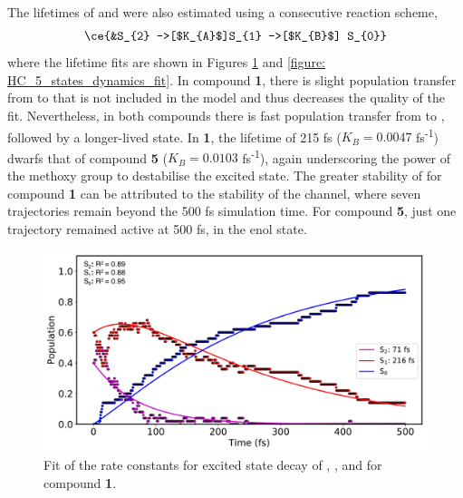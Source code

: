 The lifetimes of \stwo{} and \sone{} were also estimated using a consecutive reaction scheme,
\begin{align*}
\centering
\ce{&S_{2} ->[$K_{A}$]S_{1} ->[$K_{B}$] S_{0}}
\end{align*}
where the lifetime fits are shown in Figures \ref{figure: HC_1_states_dynamics_fit} and \ref{figure: HC_5_states_dynamics_fit}. In compound \textbf{1}, there is slight population transfer from \sone{} to \stwo{} that is not included in the model and thus decreases the quality of the \sone{} fit. Nevertheless, in both compounds there is fast population transfer from \stwo{} to \sone{}, followed by a longer-lived \sone{} state. In \textbf{1}, the lifetime of 215 fs ($K_{B}=0.0047$ fs\textsuperscript{-1}) dwarfs that of compound \textbf{5} ($K_{B}=0.0103$ fs\textsuperscript{-1}), again underscoring the power of the methoxy group to destabilise the excited state. The greater stability of \sone{} for compound \textbf{1} can be attributed to the stability of the \Estar{} channel, where seven trajectories remain beyond the 500 fs simulation time. For compound \textbf{5}, just one trajectory remained active at 500 fs, in the enol state.

\begin{figure}[H]
\centering
  \includegraphics[width=0.9\linewidth]{3nonradiativedecay/HC_1_states_dynamics_fit.pdf}
  \caption[Model of the state decay rates for \textbf{HC1}]{Fit of the rate constants for excited state decay of \stwo{}, \sone{}, and \szero{} for compound \textbf{1}.}
  \label{figure: HC_1_states_dynamics_fit}
\end{figure}

